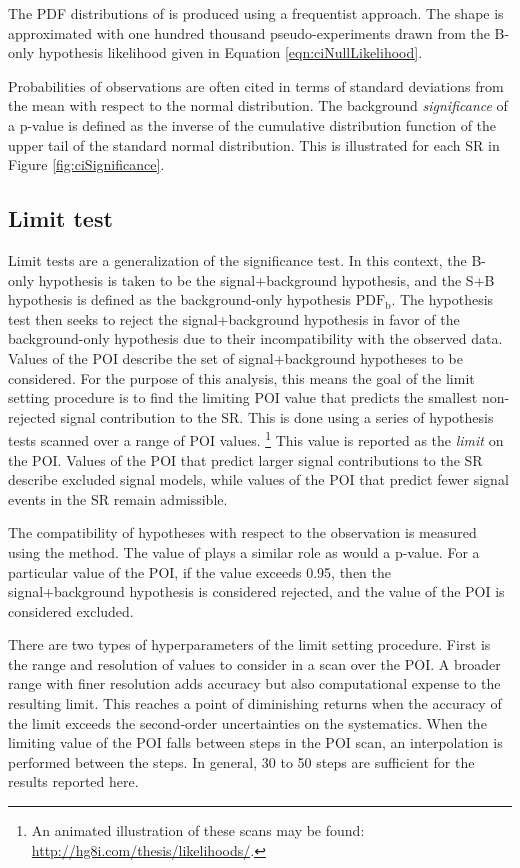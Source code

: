The PDF distributions of \nobs is produced using a frequentist approach.
The shape is approximated with one hundred thousand pseudo-experiments drawn from the B-only hypothesis likelihood given in Equation \ref{eqn:ciNullLikelihood}.

Probabilities of observations are often cited in terms of standard deviations from the mean with respect to the normal distribution.
The background \emph{significance} of a p-value is defined as the inverse of the cumulative distribution function of the upper tail of the standard normal distribution.
This is illustrated for each SR in Figure \ref{fig:ciSignificance}.

\subsection{Limit test}\label{sec:ciLimitSetting}

Limit tests are a generalization of the significance test. %
In this context, the B-only hypothesis is taken to be the signal+background hypothesis, and the S+B hypothesis is defined as the background-only hypothesis $\text{PDF}_\text{b}$.
The hypothesis test then seeks to reject the signal+background hypothesis in favor of the background-only hypothesis due to their incompatibility with the observed data.
Values of the POI describe the set of signal+background hypotheses to be considered.
For the purpose of this analysis, this means the goal of the limit setting procedure is to find the limiting POI value that predicts the smallest non-rejected signal contribution to the SR.
This is done using a series of hypothesis tests scanned over a range of POI values. \footnote{An animated illustration of these scans may be found: \url{http://hg8i.com/thesis/likelihoods/}.}
This value is reported as the \emph{limit} on the POI.
Values of the POI that predict larger signal contributions to the SR describe excluded signal models, while values of the POI that predict fewer signal events in the SR remain admissible.

The compatibility of hypotheses with respect to the observation is measured using the \cls method.
The value of \cls plays a similar role as would a p-value.
For a particular value of the POI, if the \cls value exceeds 0.95, then the signal+background hypothesis is considered rejected, and the value of the POI is considered excluded.

There are two types of hyperparameters of the limit setting procedure.
First is the range and resolution of values to consider in a scan over the POI.
A broader range with finer resolution adds accuracy but also computational expense to the resulting limit.
This reaches a point of diminishing returns when the accuracy of the limit exceeds the second-order uncertainties on the systematics.
When the limiting value of the POI falls between steps in the POI scan, an interpolation is performed between the steps.
In general, 30 to 50 steps are sufficient for the results reported here.

